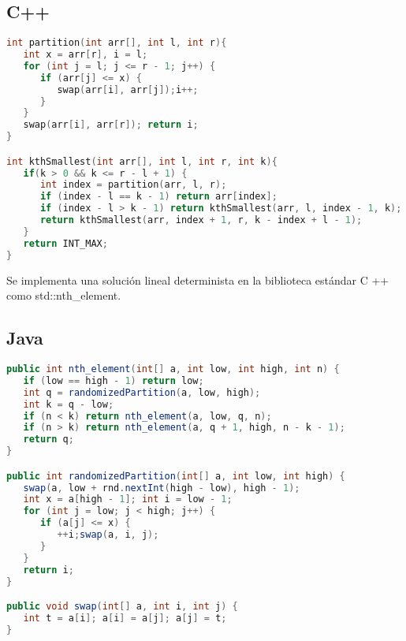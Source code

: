 \subsection{C++}

\begin{lstlisting}[language=C++]
int partition(int arr[], int l, int r){
   int x = arr[r], i = l;
   for (int j = l; j <= r - 1; j++) {
      if (arr[j] <= x) {
         swap(arr[i], arr[j]);i++;
      }
   }
   swap(arr[i], arr[r]); return i;
}

int kthSmallest(int arr[], int l, int r, int k){
   if(k > 0 && k <= r - l + 1) {
      int index = partition(arr, l, r);
      if (index - l == k - 1) return arr[index];
      if (index - l > k - 1) return kthSmallest(arr, l, index - 1, k);
	  return kthSmallest(arr, index + 1, r, k - index + l - 1);
   }
   return INT_MAX;
}
\end{lstlisting}

Se implementa una solución lineal determinista en la biblioteca estándar C ++ como std::nth\_element.

\subsection{Java}

\begin{lstlisting}[language=Java]
public int nth_element(int[] a, int low, int high, int n) {
   if (low == high - 1) return low;
   int q = randomizedPartition(a, low, high);
   int k = q - low;
   if (n < k) return nth_element(a, low, q, n);
   if (n > k) return nth_element(a, q + 1, high, n - k - 1);
   return q;
}

public int randomizedPartition(int[] a, int low, int high) {
   swap(a, low + rnd.nextInt(high - low), high - 1);
   int x = a[high - 1]; int i = low - 1;
   for (int j = low; j < high; j++) {
      if (a[j] <= x) {
         ++i;swap(a, i, j);
      }
   }
   return i;
}

public void swap(int[] a, int i, int j) {
   int t = a[i]; a[i] = a[j]; a[j] = t;
}
\end{lstlisting}